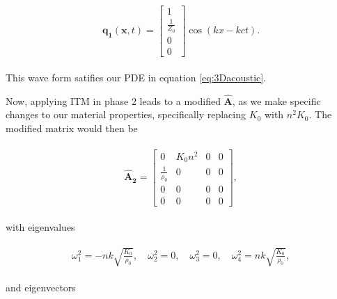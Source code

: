 \begin{align}
    \begin{split}
        \mathbf{q_1}\left(\mathbf{x}, t\right) = \begin{bmatrix}
            1 \\
            \frac{1}{Z_0} \\
            0 \\
            0
            \end{bmatrix} \cos\left(kx - k ct\right) .
    \end{split}
\end{align}

This wave form satifies our PDE in equation \ref{eq:3Dacoustic}.

Now, applying ITM in phase 2 leads to a modified $\mathbf{\hat{A}}$, as we make specific changes to our material properties, specifically replacing $K_0$ with $n^2K_0$. The modified matrix would then be

\begin{align}
    \begin{split}
    \mathbf{\hat{A}_2} = \begin{bmatrix}
        0 & K_{0} n^{2} & 0 & 0 \\
\frac{1}{\rho_{0}} & 0 & 0 & 0 \\
0 & 0 & 0 & 0 \\
0 & 0 & 0 & 0
    \end{bmatrix},
    \end{split}
\end{align}

with eigenvalues

\begin{align}
    \begin{split}
    \omega_1^2 = -n k \sqrt{\frac{K_{0}}{\rho_{0}}}, \quad
    \omega_2^2 = 0, \quad
    \omega_3^2 = 0, \quad
    \omega_4^2 = n k \sqrt{\frac{K_{0}}{\rho_{0}}},
\end{split}
\end{align}

and eigenvectors

